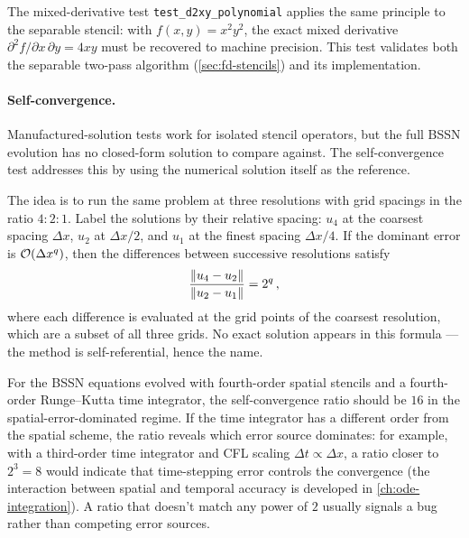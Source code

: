 The mixed-derivative test \texttt{test\_d2xy\_polynomial} applies the
same principle to the separable stencil: with $f(x,y) = x^2 y^2$, the
exact mixed derivative $\partial^2 f / \partial x\, \partial y = 4xy$
must be recovered to machine precision.  This test validates both the
separable two-pass algorithm (\cref{sec:fd-stencils}) and its
implementation.

\paragraph{Self-convergence.}

Manufactured-solution tests work for isolated stencil operators, but the
full BSSN evolution has no closed-form solution to compare against.  The
self-convergence test addresses this by using the numerical solution
itself as the reference.

The idea is to run the same problem at three resolutions with grid
spacings in the ratio $4 : 2 : 1$.  Label the solutions by their
relative spacing: $u_4$ at the coarsest spacing $\Delta x$, $u_2$ at
$\Delta x / 2$, and $u_1$ at the finest spacing $\Delta x / 4$.  If the
dominant error is $\mathcal{O}\!\left(\Delta x^q\right)$, then the differences between
successive resolutions satisfy
%
\begin{equation}
  \frac{\left\lVert u_4 - u_2 \right\rVert}{\left\lVert u_2 - u_1 \right\rVert} = 2^q \,,
  \label{eq:self-convergence-ratio}
\end{equation}
%
where each difference is evaluated at the grid points of the coarsest
resolution, which are a subset of all three grids.  No exact solution
appears in this formula --- the method is self-referential, hence the
name.

For the BSSN equations evolved with fourth-order spatial stencils and a
fourth-order Runge--Kutta time integrator, the self-convergence ratio
should be $16$ in the spatial-error-dominated regime.  If the time
integrator has a different order from the spatial scheme, the ratio
reveals which error source dominates: for example, with a third-order
time integrator and CFL scaling $\Delta t \propto \Delta x$, a ratio
closer to $2^3 = 8$ would indicate that time-stepping error controls the
convergence (the interaction between spatial and temporal accuracy is
developed in \cref{ch:ode-integration}).  A ratio that doesn't match
any power of $2$ usually signals a bug rather than competing error sources.

